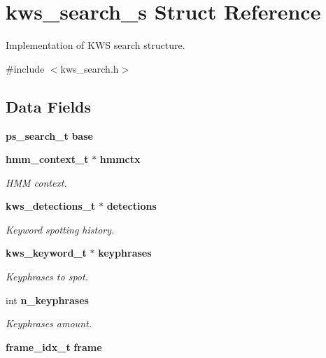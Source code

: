\section{kws\+\_\+search\+\_\+s Struct Reference}
\label{structkws__search__s}


Implementation of K\+W\+S search structure.  




{\ttfamily \#include $<$kws\+\_\+search.\+h$>$}

\subsection*{Data Fields}
\begin{DoxyCompactItemize}
\item 
{\bf ps\+\_\+search\+\_\+t} {\bfseries base}\label{structkws__search__s_a2fe82b392de65317a6b616681683942e}

\item 
{\bf hmm\+\_\+context\+\_\+t} $\ast$ {\bf hmmctx}
\begin{DoxyCompactList}\small\item\em H\+M\+M context. \end{DoxyCompactList}\item 
{\bf kws\+\_\+detections\+\_\+t} $\ast$ {\bf detections}\label{structkws__search__s_ac7bd23ef33f85b4173a8d9a7cc9b9a32}

\begin{DoxyCompactList}\small\item\em Keyword spotting history. \end{DoxyCompactList}\item 
{\bf kws\+\_\+keyword\+\_\+t} $\ast$ {\bf keyphrases}\label{structkws__search__s_a0eec404435d9f8ad2700487f8a178f48}

\begin{DoxyCompactList}\small\item\em Keyphrases to spot. \end{DoxyCompactList}\item 
int {\bf n\+\_\+keyphrases}\label{structkws__search__s_acd47cbdc3c0708d869888b99e6f5982c}

\begin{DoxyCompactList}\small\item\em Keyphrases amount. \end{DoxyCompactList}\item 
{\bf frame\+\_\+idx\+\_\+t} {\bf frame}\label{structkws__search__s_a68a833afd9d01bdf4c2cc640b575eea7}


\end{DoxyCompactItemize}
